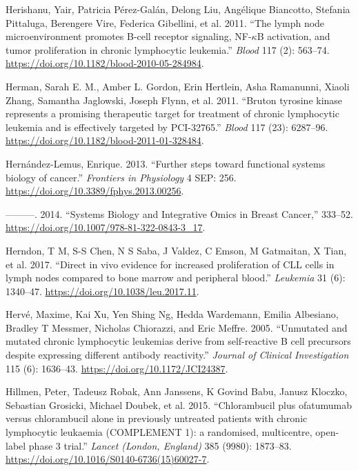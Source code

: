 \documentclass[11pt, a4paper, twosided]{book}
\newenvironment{CSLReferences}%
  {}%
  {\par}
\begin{document}
\begin{CSLReferences}{1}{0}
\leavevmode{}%
Herishanu, Yair, Patricia Pérez-Galán, Delong Liu, Angélique Biancotto, Stefania Pittaluga, Berengere Vire, Federica Gibellini, et al. 2011. {``{The lymph node microenvironment promotes B-cell receptor signaling, NF-\(\kappa\)B activation, and tumor proliferation in chronic lymphocytic leukemia}.''} \emph{Blood} 117 (2): 563--74. \url{https://doi.org/10.1182/blood-2010-05-284984}.

\leavevmode{}%
Herman, Sarah E. M., Amber L. Gordon, Erin Hertlein, Asha Ramanunni, Xiaoli Zhang, Samantha Jaglowski, Joseph Flynn, et al. 2011. {``{Bruton tyrosine kinase represents a promising therapeutic target for treatment of chronic lymphocytic leukemia and is effectively targeted by PCI-32765}.''} \emph{Blood} 117 (23): 6287--96. \url{https://doi.org/10.1182/blood-2011-01-328484}.

\leavevmode{}%
Hernández-Lemus, Enrique. 2013. {``{Further steps toward functional systems biology of cancer}.''} \emph{Frontiers in Physiology} 4 SEP: 256. \url{https://doi.org/10.3389/fphys.2013.00256}.

\leavevmode{}%
---------. 2014. {``{Systems Biology and Integrative Omics in Breast Cancer},''} 333--52. \url{https://doi.org/10.1007/978-81-322-0843-3_17}.

\leavevmode{}%
Herndon, T M, S-S Chen, N S Saba, J Valdez, C Emson, M Gatmaitan, X Tian, et al. 2017. {``{Direct in vivo evidence for increased proliferation of CLL cells in lymph nodes compared to bone marrow and peripheral blood}.''} \emph{Leukemia} 31 (6): 1340--47. \url{https://doi.org/10.1038/leu.2017.11}.

\leavevmode{}%
Hervé, Maxime, Kai Xu, Yen Shing Ng, Hedda Wardemann, Emilia Albesiano, Bradley T Messmer, Nicholas Chiorazzi, and Eric Meffre. 2005. {``{Unmutated and mutated chronic lymphocytic leukemias derive from self-reactive B cell precursors despite expressing different antibody reactivity}.''} \emph{Journal of Clinical Investigation} 115 (6): 1636--43. \url{https://doi.org/10.1172/JCI24387}.

\leavevmode{}%
Hillmen, Peter, Tadeusz Robak, Ann Janssens, K Govind Babu, Janusz Kloczko, Sebastian Grosicki, Michael Doubek, et al. 2015. {``{Chlorambucil plus ofatumumab versus chlorambucil alone in previously untreated patients with chronic lymphocytic leukaemia (COMPLEMENT 1): a randomised, multicentre, open-label phase 3 trial.}''} \emph{Lancet (London, England)} 385 (9980): 1873--83. \url{https://doi.org/10.1016/S0140-6736(15)60027-7}.


\end{CSLReferences}
\end{document}
